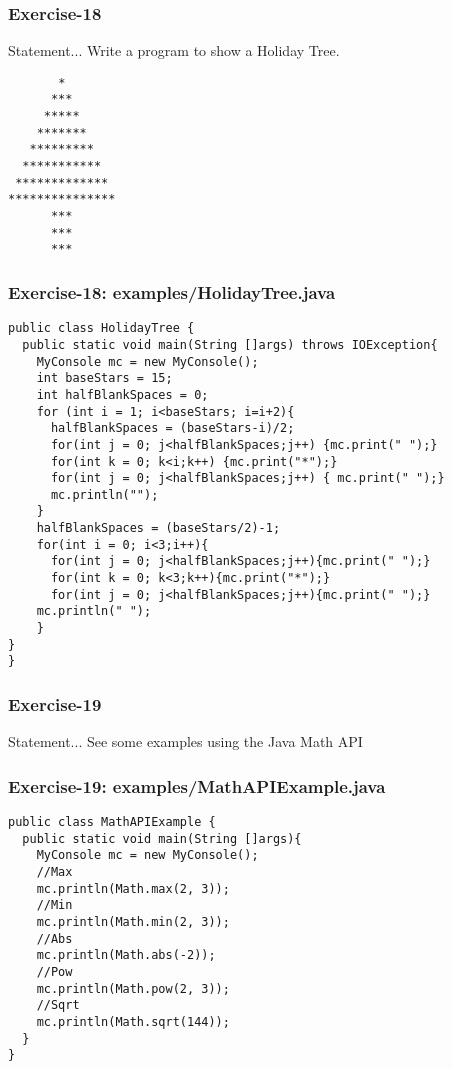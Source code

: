 \documentclass[xcolor=dvipsnames,dvip,notes=show,handout,table]{beamer}
\begin{document}
\begin{frame}[fragile]
\frametitle{Exercise-18}
\begin{block}{Statement...}
 Write a program to show a Holiday Tree.
\end{block}

\begin{lstlisting}
       *
      ***
     *****
    *******
   *********
  ***********
 *************
***************
      ***
      ***
      ***
\end{lstlisting}



\end{frame}


\begin{frame}[fragile]
\frametitle{Exercise-18: examples/HolidayTree.java}
\tiny
\begin{lstlisting}
public class HolidayTree {
  public static void main(String []args) throws IOException{
    MyConsole mc = new MyConsole();
    int baseStars = 15;
    int halfBlankSpaces = 0;
    for (int i = 1; i<baseStars; i=i+2){
      halfBlankSpaces = (baseStars-i)/2;
      for(int j = 0; j<halfBlankSpaces;j++) {mc.print(" ");}
      for(int k = 0; k<i;k++) {mc.print("*");}
      for(int j = 0; j<halfBlankSpaces;j++) { mc.print(" ");}
      mc.println("");
    }
    halfBlankSpaces = (baseStars/2)-1;
    for(int i = 0; i<3;i++){
      for(int j = 0; j<halfBlankSpaces;j++){mc.print(" ");}
      for(int k = 0; k<3;k++){mc.print("*");}
      for(int j = 0; j<halfBlankSpaces;j++){mc.print(" ");}
    mc.println(" ");
    }
}
}
\end{lstlisting}
\end{frame}


\begin{frame}[fragile]
\frametitle{Exercise-19}
\begin{block}{Statement...}
  See some examples using the Java Math API
\end{block}

\end{frame}


\begin{frame}[fragile]
\frametitle{Exercise-19: examples/MathAPIExample.java}
\tiny
\begin{lstlisting}
public class MathAPIExample {
  public static void main(String []args){
    MyConsole mc = new MyConsole();
    //Max
    mc.println(Math.max(2, 3));
    //Min
    mc.println(Math.min(2, 3));
    //Abs		
    mc.println(Math.abs(-2));
    //Pow
    mc.println(Math.pow(2, 3));
    //Sqrt
    mc.println(Math.sqrt(144));
  }
}
\end{lstlisting}
\end{frame}
\end{document}

